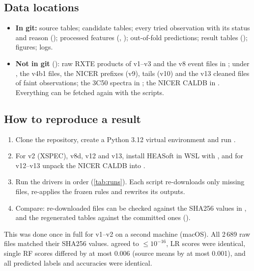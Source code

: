 \subsection{Data locations}\label{sec:locations}
\begin{itemize}
\item \textbf{In git:} source tables; candidate tables; every tried observation with its status and reason
(); processed features (, ); out-of-fold predictions;
result tables (); figures; logs.
\item \textbf{Not in git} (): raw RXTE products of v1--v3 and the v8 event files in ; under
, the v4b1 files, the NICER prefixes (v9), tails (v10) and the v13 cleaned files of faint
observations; the 3C50 spectra in ; the NICER CALDB in
. Everything can be fetched again with the scripts.
\end{itemize}

\subsection{How to reproduce a result}\label{sec:reproduce}
\begin{enumerate}
\item Clone the repository, create a Python 3.12 virtual environment and run .
\item For v2 (XSPEC), v8d, v12 and v13, install HEASoft in WSL with , and for v12--v13
unpack the NICER CALDB into .
\item Run the drivers in order (\cref{tab:runs}). Each script re-downloads only missing files, re-applies the frozen rules
and rewrites its outputs.
\item Compare: re-downloaded files can be checked against the SHA256 values in , and the
regenerated tables against the committed ones ().
\end{enumerate}
This was done once in full for v1--v2 on a second machine (macOS). All 2\,689 raw files matched their SHA256 values.
 agreed to $\le10^{-16}$, LR scores were identical, single RF scores differed by at most 0.006 (source means
by at most 0.001), and all predicted labels and accuracies were identical.

